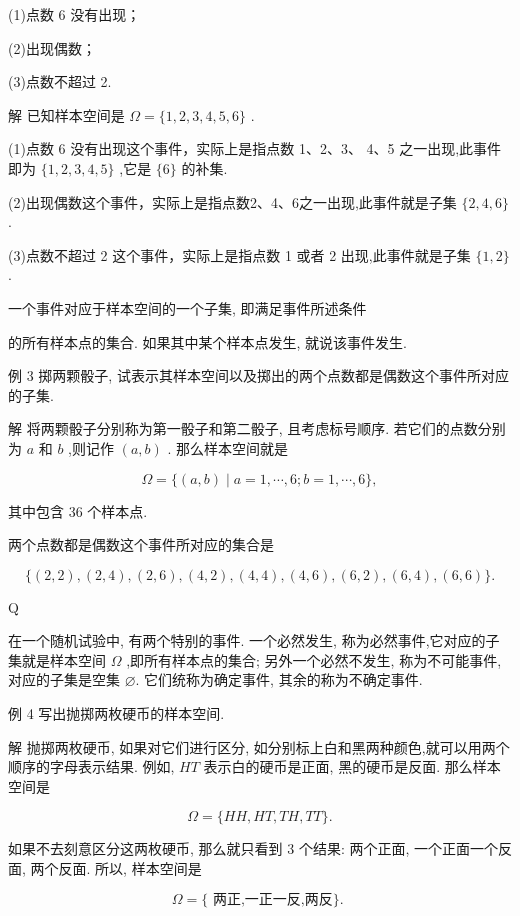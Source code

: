 \documentclass[10pt]{article}
\begin{document}
(1)点数 6 没有出现；

(2)出现偶数；

(3)点数不超过 2.

解 已知样本空间是 \(\Omega  = \{ 1,2,3,4,5,6\}\) .

(1)点数 6 没有出现这个事件，实际上是指点数 1、2、3、 4、5 之一出现,此事件即为 \(\{ 1,2,3,4,5\}\) ,它是 \(\{ 6\}\) 的补集.

(2)出现偶数这个事件，实际上是指点数2、4、6之一出现,此事件就是子集 \(\{ 2,4,6\}\) .

(3)点数不超过 2 这个事件，实际上是指点数 1 或者 2 出现,此事件就是子集 \(\{ 1,2\}\) .

一个事件对应于样本空间的一个子集, 即满足事件所述条件



的所有样本点的集合. 如果其中某个样本点发生, 就说该事件发生.

例 3 掷两颗骰子, 试表示其样本空间以及掷出的两个点数都是偶数这个事件所对应的子集.

解 将两颗骰子分别称为第一骰子和第二骰子, 且考虑标号顺序. 若它们的点数分别为 \(a\) 和 \(b\) ,则记作 \(\left( {a,b}\right)\) . 那么样本空间就是

\[
\Omega  = \{ \left( {a,b}\right)  \mid  a = 1,\cdots ,6;b = 1,\cdots ,6\} ,
\]

其中包含 36 个样本点.

两个点数都是偶数这个事件所对应的集合是

\[
\{ \left( {2,2}\right) ,\left( {2,4}\right) ,\left( {2,6}\right) ,\left( {4,2}\right) ,\left( {4,4}\right) ,\left( {4,6}\right) ,\left( {6,2}\right) ,\left( {6,4}\right) ,\left( {6,6}\right) \} .
\]

Q

在一个随机试验中, 有两个特别的事件. 一个必然发生, 称为必然事件,它对应的子集就是样本空间 \(\Omega\) ,即所有样本点的集合; 另外一个必然不发生, 称为不可能事件, 对应的子集是空集 ⌀. 它们统称为确定事件, 其余的称为不确定事件.

例 4 写出抛掷两枚硬币的样本空间.

解 抛掷两枚硬币, 如果对它们进行区分, 如分别标上白和黑两种颜色,就可以用两个顺序的字母表示结果. 例如, \({HT}\) 表示白的硬币是正面, 黑的硬币是反面. 那么样本空间是

\[
\Omega  = \{ {HH},{HT},{TH},{TT}\} .
\]

如果不去刻意区分这两枚硬币, 那么就只看到 3 个结果: 两个正面, 一个正面一个反面, 两个反面. 所以, 样本空间是

\[
\Omega  = \{ \text{ 两正,一正一反,两反\}. }
\]
\end{document}
